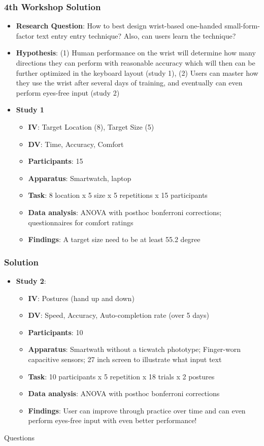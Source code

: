 \documentclass{beamer}
\begin{document}
\begin{frame}
	\frametitle{4th Workshop Solution}
	\begin{itemize}
		\item \textbf{Research Question}:  How to best design wrist-based one-handed small-form-factor text entry entry technique?  Also,  can users learn the technique?
		\item \textbf{Hypothesis}:  (1) Human performance on the wrist will determine how many directions they can perform with reasonable accuracy which will then can be further optimized in the keyboard layout (study 1),  (2) Users can master how they use the wrist after several days of training, and eventually can even perform eyes-free input (study 2)
		\item \textbf{Study 1}		
		\begin{itemize}
			\item \textbf{IV}: Target Location (8), Target Size (5) 
			\item \textbf{DV}: Time,  Accuracy,  Comfort
			\item \textbf{Participants}: 15
			\item \textbf{Apparatus}: Smartwatch, laptop
			\item \textbf{Task}: 8 location x 5 size x 5 repetitions x 15 participants
			\item \textbf{Data analysis}: ANOVA with posthoc bonferroni corrections;  questionnaires for comfort ratings
			\item \textbf{Findings}: A target size need to be at least 55.2 degree
		\end{itemize}
		
		\end{itemize}
\end{frame}

\begin{frame}
	\frametitle{Solution}
	\begin{itemize}
		\item \textbf{Study 2}:
		\begin{itemize}
			\item \textbf{IV}: Postures (hand up and down) 
			\item \textbf{DV}: Speed, Accuracy, Auto-completion rate (over 5 days)
			\item \textbf{Participants}: 10
			\item \textbf{Apparatus}: Smartwath without a ticwatch phototype; Finger-worn capacitive sensors; 27 inch screen to illustrate what input text 
			\item \textbf{Task}: 10 participants x 5 repetition x 18 trials x 2 postures
			\item \textbf{Data analysis}: ANOVA with posthoc bonferroni corrections
			\item \textbf{Findings}: User can improve through practice over time and can even perform eyes-free input with even better performance!
		\end{itemize}
	\end{itemize}
\end{frame}

\begin{frame}
\Huge{\centerline{Questions}}
\end{frame}

\end{document}
